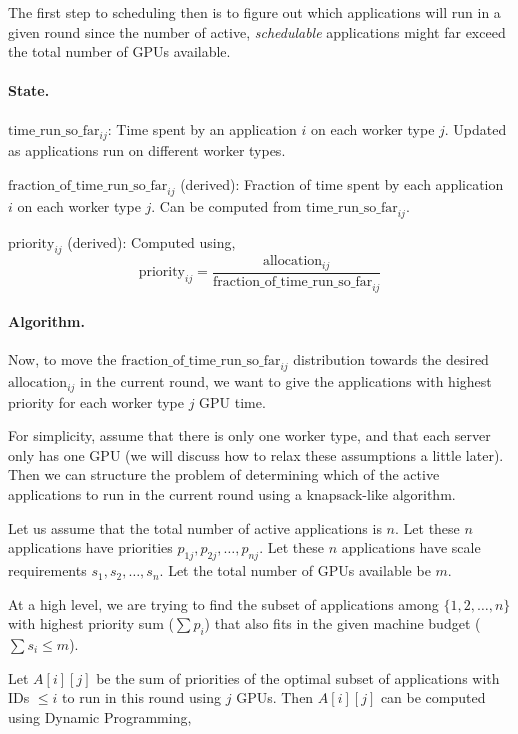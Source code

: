 \documentclass{article}
\begin{document}
The first step to scheduling then is to figure out which applications will run
in a given round since the number of active, \emph{schedulable} applications
might far exceed the total number of GPUs available.

\paragraph{State.} $\text{time\_run\_so\_far}_{ij}$: Time spent by an
application $i$ on each worker type $j$. Updated as applications run on different
worker types.

$\text{fraction\_of\_time\_run\_so\_far}_{ij}$ (derived): Fraction of time spent
by each application $i$ on each worker type $j$. Can be computed from $\text{time\_run\_so\_far}_{ij}$.

$\text{priority}_{ij}$ (derived): Computed using,
$$\text{priority}_{ij} = \dfrac{\text{allocation}_{ij}}{\text{fraction\_of\_time\_run\_so\_far}_{ij}}$$

\paragraph{Algorithm.} Now, to move the $\text{fraction\_of\_time\_run\_so\_far}_{ij}$
distribution towards the desired $\text{allocation}_{ij}$ in the current round,
we want to give the applications with highest priority for each worker type $j$
GPU time.

For simplicity, assume that there is only one worker type, and that each server
only has one GPU (we will discuss how to relax these assumptions a little later).
Then we can structure the problem of determining which of the active applications
to run in the current round using a knapsack-like algorithm.

Let us assume that the total number of active applications is $n$. Let these
$n$ applications have priorities $p_{1j}, p_{2j}, \ldots, p_{nj}$. Let these $n$ applications
have scale requirements $s_1, s_2, \ldots, s_n$. Let the total number of GPUs
available be $m$.

At a high level, we are trying to find the subset of applications among $\{1, 2, \ldots, n\}$
with highest priority sum ($\sum p_i$) that also fits in the given machine budget
($\sum s_i \leq m$).

Let $A[i][j]$ be the sum of priorities of the optimal subset of applications with
IDs $\leq i$ to run in this round using $j$ GPUs. Then $A[i][j]$ can be
computed using Dynamic Programming,
\end{document}
